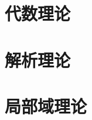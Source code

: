 \documentclass[geometry=a4, fontsetup=font-setup-open.tex, titlesetup=titles-setup, coverpage=cover]{AJbook}
\theoremstyle{nonumberplain}%
\theoremstyle{plain}%
\begin{document}
\frontmatter        %



\mainmatter

\part{代数理论}





\part{解析理论}





\part{局部域理论}









\printindex
{}
\end{document}
